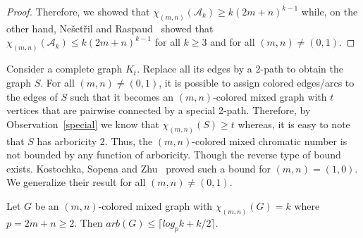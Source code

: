 \documentclass[11pt]{article}
\begin{document}
\begin{proof}
Therefore, we showed that $\chi_{(m,n)}(\mathcal{A}_k) \geq k(2m+n)^{k-1}$ 
while, on the other hand, Ne\v{s}et\v{r}il and Raspaud~\cite{raspaud_and_nesetril} showed that $\chi_{(m,n)}(\mathcal{A}_k) \leq k(2m+n)^{k-1}$ for all $k \geq 3$ and for all $(m,n) \neq (0,1)$. 
  \end{proof}



Consider a complete graph  $K_t$. Replace all its edges  by a 2-path to obtain the graph $S$. 
For all $(m,n) \neq (0,1)$, it is possible to assign colored edges/arcs to 
the edges of $S$ such that it becomes an $(m,n)$-colored mixed graph with $t$ vertices that are pairwise connected by 
a special 2-path. Therefore, by Observation~\ref{special} we know that $\chi_{(m,n)}(S) \geq t$ whereas, it is easy to note that $S$ has arboricity 2. 
Thus, the $(m,n)$-colored mixed chromatic number  is not bounded by any function of arboricity.
Though the reverse type of bound exists. Kostochka, Sopena and Zhu~\cite{Kostochka97acyclicand}  proved such a bound for $(m,n) =(1,0)$. We generalize their result for all $(m,n) \neq (0,1)$. 





\begin{theorem}\label{chromatic-arboricity}
Let $G$ be an $(m,n)$-colored mixed graph with $\chi_{(m,n)}(G) = k$ where $p = 2m+n \geq 2$. Then $arb(G) \leq \lceil log_{p}k +k/2 \rceil $. 
\end{theorem}
\end{document}
